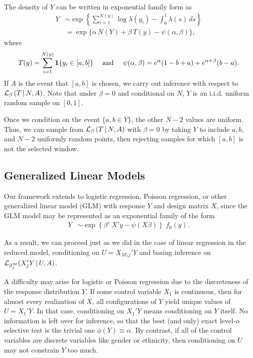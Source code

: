 \documentclass{article}
\theoremstyle{definition}
\newcommand{\bX}{X}
\newcommand{\cL}{\mathcal{L}}
\begin{document}
The density of $Y$ can be written in exponential family form as
\begin{align}
  Y
  &\sim \exp\left\{ \sum_{i=1}^{N(y)} \log \lambda(y_i)
    - \int_0^1 \lambda(s)\,ds\right\} \\[3pt]
  & = \exp\big\{\alpha\, N(Y) + \beta \,T(y) - \psi(\alpha,\beta)\big\},
\end{align}
where
\begin{equation}
  T(y) = \sum_{i=1}^{N(y)} \mathbf{1}\{y_i\in [a,b]\} \quad\text{ and }\quad \psi(\alpha,\beta) = e^\alpha(1-b+a) + e^{\alpha+\beta}(b-a).
\end{equation}
If $A$ is the event that $[a,b]$ is chosen, we carry out inference with respect to $\cL_\beta\left(T \gv N, A\right)$. Note that under $\beta=0$ and conditional on $N$, $Y$ is an i.i.d. uniform random sample on $[0,1]$.

Once we condition on the event $\{a,b\in Y\}$, the other $N-2$ values are uniform. Thus, we can sample from $\cL_\beta\left(T \gv N, A\right)$ with $\beta=0$ by taking $Y$ to include $a, b$, and $N-2$ uniformly random points, then rejecting samples for which $[a,b]$ is not the selected window.


\subsection{Generalized Linear Models}\label{sec:glm}

Our framework extends to logistic regression, Poisson regression, or other generalized linear model (GLM) with response $Y$ and design matrix $\bX$, since the GLM model may be represented as an exponential family of the form
\begin{align}
  Y &\sim \exp\left\{ \beta'\;\bX'y -
    \psi(\bX\beta)\right\}\; f_0(y).
\end{align}

As a result, we can proceed just as we did in the case of linear regression in the reduced model, conditioning on $U={\bX_{M\setminus j}}'Y$ and basing inference on $\cL_{\beta_j^{M}}(X_j'Y \gv U, A)$.

A difficulty may arise for logistic or Poisson regression due to the discreteness of the response distribution $Y$. If some control variable $X_1$ is continuous, then for almost every realization of $X$, all configurations of $Y$ yield unique values of $U=X_1'Y$. In that case, conditioning on $X_1'Y$ means conditioning on $Y$ itself. No information is left over for inference, so that the best (and only) exact level-$\alpha$ selective test is the trivial one $\phi(Y)\equiv\alpha$. By contrast, if all of the control variables are discrete variables like gender or ethnicity, then conditioning on $U$ may not constrain $Y$ too much.
\end{document}
